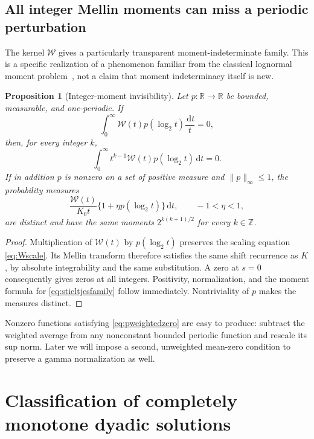 \documentclass[11pt,letterpaper]{article}
\numberwithin{equation}{section}
\newtheorem{proposition}[theorem]{Proposition}
\theoremstyle{definition}
\theoremstyle{remark}
\newcommand{\R}{\mathbb R}
\newcommand{\Z}{\mathbb Z}
\newcommand{\W}{\mathcal W}
\newcommand{\dd}{\,\mathrm d}
\begin{document}
\subsection{All integer Mellin moments can miss a periodic perturbation}
The kernel $\W$ gives a particularly transparent moment-indeterminate
family. This is a specific realization of a phenomenon familiar from the
classical lognormal moment problem~\cite{Heyde}, not a claim that moment
indeterminacy itself is new.

\begin{proposition}[Integer-moment invisibility]\label{prop:invisible}
Let $p:\R\to\R$ be bounded, measurable, and one-periodic. If
\begin{equation}\label{eq:pweightedzero}
 \int_0^\infty \W(t)p(\log_2t)\frac{\dd t}{t}=0,
\end{equation}
then, for every integer $k$,
\begin{equation}\label{eq:allmomentzero}
 \int_0^\infty t^{k-1}\W(t)p(\log_2t)\dd t=0.
\end{equation}
If in addition $p$ is nonzero on a set of positive measure and
$\|p\|_\infty\le1$, the probability measures
\begin{equation}\label{eq:stieltjesfamily}
 \frac{\W(t)}{K_0t}\{1+\eta p(\log_2t)\}\dd t,
 \qquad -1<\eta<1,
\end{equation}
are distinct and have the same moments $2^{k(k+1)/2}$ for every $k\in\Z$.
\end{proposition}
\begin{proof}
Multiplication of $\W(t)$ by $p(\log_2t)$ preserves the scaling equation
\eqref{eq:Wscale}. Its Mellin transform therefore satisfies the same shift
recurrence as $K$, by absolute integrability and the same substitution.
A zero at $s=0$ consequently gives zeros at all integers.
Positivity, normalization, and the moment formula for
\eqref{eq:stieltjesfamily} follow immediately. Nontriviality of $p$ makes
the measures distinct.
\end{proof}

Nonzero functions satisfying \eqref{eq:pweightedzero} are easy to produce:
subtract the weighted average from any nonconstant bounded periodic
function and rescale its sup norm. Later we will impose a second,
unweighted mean-zero condition to preserve a gamma normalization as well.

\section{Classification of completely monotone dyadic solutions}\label{sec:classification}
\end{document}
